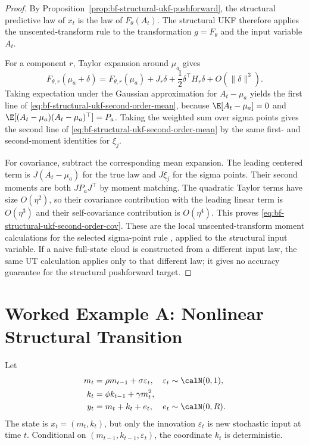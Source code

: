 \begin{proof}
By Proposition~\ref{prop:bf-structural-ukf-pushforward}, the structural
predictive law of $x_t$ is the law of $F_\theta(A_t)$.  The structural UKF
therefore applies the unscented-transform rule to the transformation
$g=F_\theta$ and the input variable $A_t$.

For a component $r$, Taylor expansion around $\mu_a$ gives
\[
  F_{\theta,r}(\mu_a+\delta)
  =
  F_{\theta,r}(\mu_a)
  +J_r\delta
  +\frac{1}{2}\delta^\top H_r\delta
  +O(\|\delta\|^3).
\]
Taking expectation under the Gaussian approximation for
$A_t-\mu_a$ yields the first line of
\eqref{eq:bf-structural-ukf-second-order-mean}, because
$\E[A_t-\mu_a]=0$ and
$\E[(A_t-\mu_a)(A_t-\mu_a)^\top]=P_a$.  Taking the weighted sum over sigma
points gives the second line of
\eqref{eq:bf-structural-ukf-second-order-mean} by the same first- and
second-moment identities for $\xi_j$.

For covariance, subtract the corresponding mean expansion.  The leading
centered term is $J(A_t-\mu_a)$ for the true law and $J\xi_j$ for the sigma
points.  Their second moments are both $JP_aJ^\top$ by moment matching.  The
quadratic Taylor terms have size $O(\eta^2)$, so their covariance contribution
with the leading linear term is $O(\eta^3)$ and their self-covariance
contribution is $O(\eta^4)$.  This proves
\eqref{eq:bf-structural-ukf-second-order-cov}.  These are the local
unscented-transform moment calculations for the selected sigma-point rule
\citep{julier1996general,vandermerwe2004sigma}, applied to the structural
input variable.  If a naive full-state cloud is constructed from a different
input law, the same UT calculation applies only to that different law; it gives
no accuracy guarantee for the structural pushforward target.
\end{proof}

\section{Worked Example A: Nonlinear Structural Transition}
\label{sec:bf-nonlinear-structural-transition-example}

Let
\begin{align}
  m_t &= \rho m_{t-1}+\sigma\varepsilon_t,
    & \varepsilon_t &\sim \calN(0,1), \label{eq:bf-ukf-example-m}\\
  k_t &= \phi k_{t-1}+\gamma m_t^2, \label{eq:bf-ukf-example-k}\\
  y_t &= m_t+k_t+e_t,
    & e_t &\sim \calN(0,R). \label{eq:bf-ukf-example-y}
\end{align}
The state is $x_t=(m_t,k_t)$, but only the innovation
$\varepsilon_t$ is new stochastic input at time $t$.  Conditional on
$(m_{t-1},k_{t-1},\varepsilon_t)$, the coordinate $k_t$ is deterministic.

